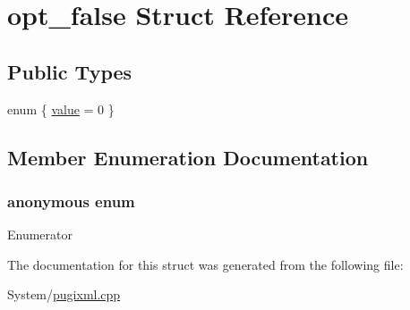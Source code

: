 \hypertarget{structopt__false}{\section{opt\-\_\-false Struct Reference}
\label{structopt__false}
}
\subsection*{Public Types}
\begin{DoxyCompactItemize}
\item 
enum \{ \hyperlink{structopt__false_adf1eb3ad7c3e284bd861d80d6817174fa0608b30b4b0f63ec3263f29fe847899e}{value} = 0
 \}
\end{DoxyCompactItemize}


\subsection{Member Enumeration Documentation}
\hypertarget{structopt__false_adf1eb3ad7c3e284bd861d80d6817174f}{\subsubsection[{anonymous enum}]{\setlength{\rightskip}{0pt plus 5cm}anonymous enum}}\label{structopt__false_adf1eb3ad7c3e284bd861d80d6817174f}
\begin{Desc}
\item[Enumerator]\par
\begin{description}
\item[{\em 
\hypertarget{structopt__false_adf1eb3ad7c3e284bd861d80d6817174fa0608b30b4b0f63ec3263f29fe847899e}{value}\label{structopt__false_adf1eb3ad7c3e284bd861d80d6817174fa0608b30b4b0f63ec3263f29fe847899e}
}]\end{description}
\end{Desc}


The documentation for this struct was generated from the following file\-:\begin{DoxyCompactItemize}
\item 
System/\hyperlink{pugixml_8cpp}{pugixml.\-cpp}\end{DoxyCompactItemize}

